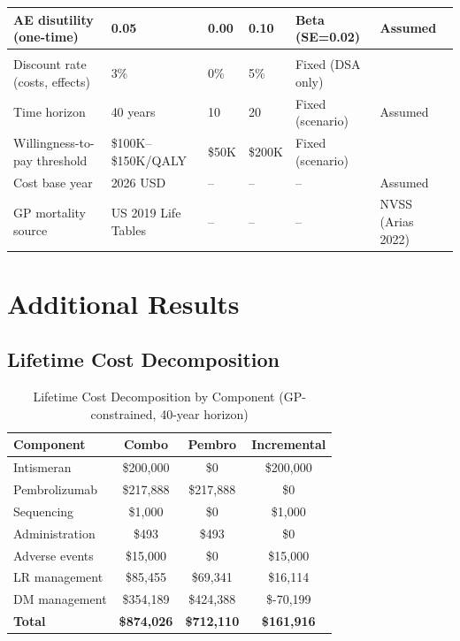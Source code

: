 \documentclass[11pt,a4paper]{article}
\begin{document}
\begin{landscape}
\begin{table}[p]
\begin{tabularx}{\linewidth}{@{}>{\raggedright\arraybackslash}Xlll>{\raggedright\arraybackslash}Xl@{}}
AE disutility (one-time) & 0.05 & 0.00 & 0.10 & Beta (SE=0.02) & Assumed \\
\midrule
\multicolumn{6}{c}{\textit{Economic Parameters}} \\
Discount rate (costs, effects) & 3\% & 0\% & 5\% & Fixed (DSA only) & \cite{sanders2016} \\
Time horizon & 40 years & 10 & 20 & Fixed (scenario) & Assumed \\
Willingness-to-pay threshold & \$100K--\$150K/QALY & \$50K & \$200K & Fixed (scenario) & \cite{neumann2014} \\
Cost base year & 2026 USD & -- & -- & -- & Assumed \\
GP mortality source & US 2019 Life Tables & -- & -- & -- & NVSS (Arias 2022) \\
\bottomrule
\end{tabularx}
\end{table}
\end{landscape}

\section{Additional Results}

\subsection{Lifetime Cost Decomposition}
\label{sec:cost_decomp}
\begin{table}[H]
\centering
\caption{Lifetime Cost Decomposition by Component (GP-constrained, 40-year horizon)}
\label{tab:s9}
\begin{tabular}{lccc}
\toprule
\textbf{Component} & \textbf{Combo} & \textbf{Pembro} & \textbf{Incremental} \\
\midrule
Intismeran & \$200,000 & \$0 & \$200,000 \\
Pembrolizumab & \$217,888 & \$217,888 & \$0 \\
Sequencing & \$1,000 & \$0 & \$1,000 \\
Administration & \$493 & \$493 & \$0 \\
Adverse events & \$15,000 & \$0 & \$15,000 \\
LR management & \$85,455 & \$69,341 & \$16,114 \\
DM management & \$354,189 & \$424,388 & \$-70,199 \\
\midrule
\textbf{Total} & \textbf{\$874,026} & \textbf{\$712,110} & \textbf{\$161,916} \\
\bottomrule
\end{tabular}
\end{table}
\end{document}
